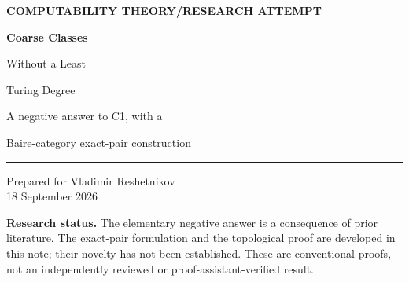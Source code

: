 \documentclass[11pt,a4paper]{article}
\theoremstyle{definition}\newtheorem{definition}[theorem]{Definition}
\theoremstyle{remark}\newtheorem{remark}[theorem]{Remark}
\begin{document}
\begin{titlepage}
\vspace*{12mm}
{\small\sffamily\bfseries\color{navy}COMPUTABILITY THEORY\quad /\quad RESEARCH ATTEMPT\par}
\vspace{14mm}
{\Huge\bfseries\color{navy}Coarse Classes\par Without a Least\par Turing Degree\par}
\vspace{9mm}
{\Large A negative answer to C1, with a\par Baire-category exact-pair construction\par}
\vspace{12mm}
\noindent\rule{\textwidth}{0.5pt}
\vspace{4mm}
\noindent Prepared for Vladimir Reshetnikov\\[3pt]
18 September 2026
\vspace{10mm}
\begin{abstract}
We attack the least-Turing-degree question for coarse equivalence classes, designated C1 in the supplied survey. The universal assertion is false: the uniform and nonuniform coarse classes of every $1$-generic set have no representative of least Turing degree. This basic negative answer already follows from a theorem of Hirschfeldt, Jockusch, Kuyper, and Schupp and is not claimed as a new discovery. We then prove a stronger structural statement. Given a set $X$ and a prescribed coarse description $P$ of $X$, there is another description $D$ such that the sets computable from both $P$ and $D$ are exactly those computable from every coarse description of $X$. The proof equips the description class with a complete prefix-density metric and establishes an all-or-meager dichotomy for Turing cones. For $1$-generic $X$, this produces a Turing minimal pair inside a single density-zero equivalence class, indeed a countable pairwise minimal-pair family. Full conventional proofs, a precise literature reconciliation, and bounded computational checks are supplied.
\end{abstract}
\vfill
\noindent\colorbox{pale}{\parbox{\dimexpr\textwidth-2\fboxsep\relax}{\small
\textbf{Research status.} The elementary negative answer is a consequence of prior literature. The exact-pair formulation and the topological proof are developed in this note; their novelty has not been established. These are conventional proofs, not an independently reviewed or proof-assistant-verified result.}}
\end{titlepage}
{\small\tableofcontents}
\newpage
\end{document}
